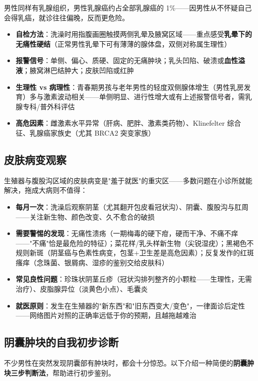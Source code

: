 男性同样有乳腺组织，男性乳腺癌约占全部乳腺癌的 1\%——因男性从不怀疑自己会得乳癌，就诊往往偏晚，反而更危险。

\begin{itemize}
	\item \textbf{自检方法}：洗澡时用指腹画圈触摸两侧乳晕及腋窝区域——重点感受\textbf{乳晕下的无痛性硬结}（正常男性乳晕下可有薄薄的腺体盘，双侧对称属生理性）
	\item \textbf{报警信号}：单侧、偏心、质硬、固定的无痛肿块；乳头凹陷、破溃或\textbf{血性溢液}；腋窝淋巴结肿大；皮肤凹陷或红肿
	\item \textbf{生理性 vs 病理性}：青春期男孩与老年男性的轻度双侧腺体增生（男性乳房发育）多与激素波动相关——单侧明显、进行性增大或有上述报警信号者，需乳腺专科/普外科评估
	\item \textbf{高危因素}：雌激素水平异常（肝病、肥胖、激素类药物）、Klinefelter 综合征、乳腺癌家族史（尤其 BRCA2 突变家族）
\end{itemize}

\subsection{皮肤病变观察}


生殖器与腹股沟区域的皮肤病变是"羞于就医"的重灾区——多数问题在小诊所就能解决，拖成大病则不值得：

\begin{itemize}
	\item \textbf{每月一次}：洗澡后观察阴茎（尤其翻开包皮看冠状沟）、阴囊、腹股沟与肛周——关注新生物、颜色改变、久不愈合的破损
	\item \textbf{需要警惕的发现}：无痛性溃疡（一期梅毒的硬下疳，硬而干净、不痛不痒——"不痛"恰是最危险的特征）；菜花样/乳头样新生物（尖锐湿疣）；黑褐色不规则新斑（阴茎癌与色素性病变，包茎+卫生差是高危因素）；反复发作的红斑瘙痒（念珠菌、银屑病、湿疹的鉴别交给皮肤科）
	\item \textbf{常见良性问题}：珍珠状阴茎丘疹（冠状沟排列整齐的小颗粒——生理性，无需治疗）、皮脂腺异位（淡黄色小点）、毛囊炎
	\item \textbf{就医原则}：发生在生殖器的"新东西"和"旧东西变大/变色"，一律面诊后定性——网络图片对照的正确率远低于你的预期，且越拖越难治
\end{itemize}

\subsection{阴囊肿块的自我初步诊断}

不少男性在突然发现阴囊部有肿块时，都会十分惊恐。以下介绍一种简便的\textbf{阴囊肿块三步判断法}，帮助进行初步鉴别。

